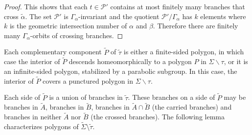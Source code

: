 \documentclass[11pt]{article}
\theoremstyle{remark}
\newcommand{\cP}{{\mathcal P}}
\begin{document}
\begin{proof}
This shows that each $t \in \cP'$ contains at most finitely many branches that cross
$\tilde\alpha$.
The set $\cP'$ is $\Gamma_\alpha$-invariant and the quotient $\cP'/\Gamma_\alpha$ has $k$ elements where $k$ is the geometric intersection number of $\alpha$ and $\beta$. Therefore there are finitely many $\Gamma_\alpha$-orbits of crossing branches.
\end{proof}

Each complementary component $\tilde P$ of $\tilde\tau$ is either a finite-sided polygon, in which case the interior of $\tilde P$ descends homeomorphically to a polygon $P$ in $\Sigma \smallsetminus\tau$, or it is an infinite-sided polygon, stabilized by a parabolic subgroup. In this case, the interior of $\tilde P$ covers a punctured polygon in $\Sigma\smallsetminus\tau$.

Each side of $\tilde P$ is a union of branches in $\tilde\tau$.
These branches on a side of $\tilde P$ may be branches in $\tilde{A}$, branches in $\tilde{B}$, branches in $\tilde{A}\cap\tilde{B}$ (the carried branches) and branches in neither $\tilde{A}$ nor $\tilde{B}$ (the crossed branches).
The following lemma characterizes polygons of $\tilde \Sigma \setminus \tilde \tau$.
\end{document}
